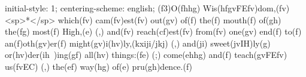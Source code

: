 initial-style: 1;
centering-scheme: english;
(f3)O(fhhg) Wis(hfgvFEfv)dom,(fv) <sp>*</sp> which(fv) cam(fv)est(fv) out(gv) of(f) the(f) mouth(f) of(gh) the(fg) most(f) High,(e) (,) and(fv) reach(cf)est(fv) from(fv) one(gv) end(f) to(f) an(f)oth(gv)er(f) might(gv)i(hv)ly,(kxiji/jkj) (,) and(ji) sweet(jvIH)ly(g) or(hv)der(ih~)ing(gf) all(hv) things:(fe) (;) come(ehhg) and(f) teach(gvFEfv) us(fvEC) (,) the(ef) way(hg) of(e) pru(gh)dence.(f)
